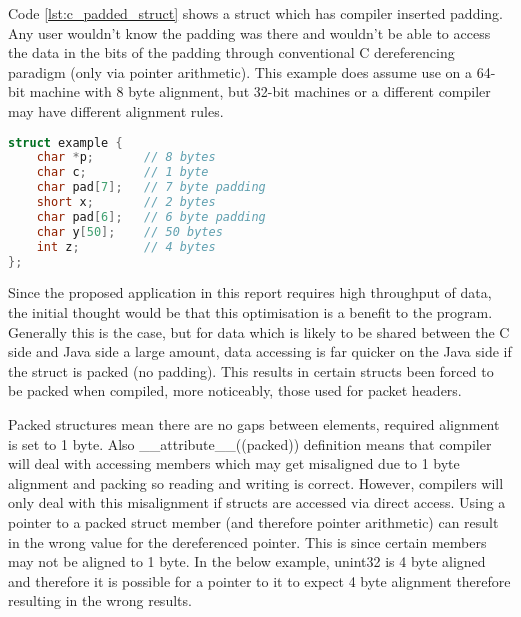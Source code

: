 \documentclass[final_report.tex]{subfiles}
\begin{document}
Code \ref{lst:c_padded_struct} shows a struct which has compiler inserted padding. Any user wouldn't know the padding was there and wouldn't be able to access the data in the bits of the padding through conventional C dereferencing paradigm (only via pointer arithmetic). This example does assume use on a 64-bit machine with 8 byte alignment, but 32-bit machines or a different compiler may have different alignment rules.

\begin{lstlisting}[language=C, caption={Example C Struct with compiler inserted padding}, label=lst:c_padded_struct]
struct example {
    char *p;       // 8 bytes
    char c;        // 1 byte
    char pad[7];   // 7 byte padding
    short x;       // 2 bytes
    char pad[6];   // 6 byte padding
    char y[50];    // 50 bytes
    int z;         // 4 bytes
};
\end{lstlisting}

Since the proposed application in this report requires high throughput of data, the initial thought would be that this optimisation is a benefit to the program. Generally this is the case, but for data which is likely to be shared between the C side and Java side a large amount, data accessing is far quicker  on the Java side if the struct is packed (no padding). This results in certain structs been forced to be packed when compiled, more noticeably, those used for packet headers.

Packed structures mean there are no gaps between elements, required alignment is set to 1 byte. Also \_\_attribute\_\_((packed)) definition means that compiler will deal with accessing members which may get misaligned due to 1 byte alignment and packing so reading and writing is correct. However, compilers will only deal with this misalignment if structs are accessed via direct access. Using a pointer to a packed struct member (and therefore pointer arithmetic) can result in the wrong value for the dereferenced pointer. This is since certain members may not be aligned to 1 byte. In the below example, unint32 is 4 byte aligned and therefore it is possible for a pointer to it to expect 4 byte alignment therefore resulting in the wrong results.
\end{document}
